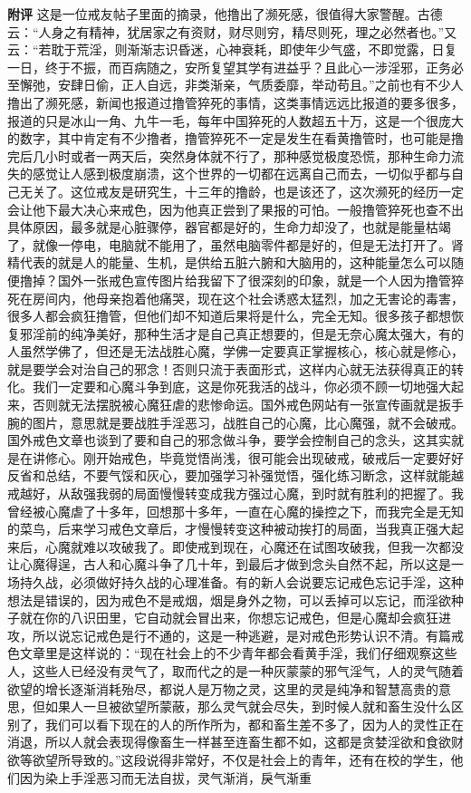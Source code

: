 \begin{case}
    \textbf{附评} 这是一位戒友帖子里面的摘录，他撸出了濒死感，很值得大家警醒。古德云：“人身之有精神，犹居家之有资财，财尽则穷，精尽则死，理之必然者也。”又云：“若耽于荒淫，则渐渐志识昏迷，心神衰耗，即使年少气盛，不即觉露，日复一日，终于不振，而百病随之，安所复望其学有进益乎？且此心一涉淫邪，正务必至懈弛，安肆日偷，正人自远，非类渐亲，气质委靡，举动苟且。”之前也有不少人撸出了濒死感，新闻也报道过撸管猝死的事情，这类事情远远比报道的要多很多，报道的只是冰山一角、九牛一毛，每年中国猝死的人数超五十万，这是一个很庞大的数字，其中肯定有不少撸者，撸管猝死不一定是发生在看黄撸管时，也可能是撸完后几小时或者一两天后，突然身体就不行了，那种感觉极度恐慌，那种生命力流失的感觉让人感到极度崩溃，这个世界的一切都在远离自己而去，一切似乎都与自己无关了。这位戒友是研究生，十三年的撸龄，也是该还了，这次濒死的经历一定会让他下最大决心来戒色，因为他真正尝到了果报的可怕。一般撸管猝死也查不出具体原因，最多就是心脏骤停，器官都是好的，生命力却没了，也就是能量枯竭了，就像一停电，电脑就不能用了，虽然电脑零件都是好的，但是无法打开了。肾精代表的就是人的能量、生机，是供给五脏六腑和大脑用的，这种能量怎么可以随便撸掉？国外一张戒色宣传图片给我留下了很深刻的印象，就是一个人因为撸管猝死在房间内，他母亲抱着他痛哭，现在这个社会诱惑太猛烈，加之无害论的毒害，很多人都会疯狂撸管，但他们却不知道后果将是什么，完全无知。很多孩子都想恢复邪淫前的纯净美好，那种生活才是自己真正想要的，但是无奈心魔太强大，有的人虽然学佛了，但还是无法战胜心魔，学佛一定要真正掌握核心，核心就是修心，就是要学会对治自己的邪念！否则只流于表面形式，这样内心就无法获得真正的转化。我们一定要和心魔斗争到底，这是你死我活的战斗，你必须不顾一切地强大起来，否则就无法摆脱被心魔狂虐的悲惨命运。国外戒色网站有一张宣传画就是扳手腕的图片，意思就是要战胜手淫恶习，战胜自己的心魔，比心魔强，就不会破戒。国外戒色文章也谈到了要和自己的邪念做斗争，要学会控制自己的念头，这其实就是在讲修心。刚开始戒色，毕竟觉悟尚浅，很可能会出现破戒，破戒后一定要好好反省和总结，不要气馁和灰心，要加强学习补强觉悟，强化练习断念，这样就能越戒越好，从敌强我弱的局面慢慢转变成我方强过心魔，到时就有胜利的把握了。我曾经被心魔虐了十多年，回想那十多年，一直在心魔的操控之下，而我完全是无知的菜鸟，后来学习戒色文章后，才慢慢转变这种被动挨打的局面，当我真正强大起来后，心魔就难以攻破我了。即使戒到现在，心魔还在试图攻破我，但我一次都没让心魔得逞，古人和心魔斗争了几十年，到最后才做到念头自然不起，所以这是一场持久战，必须做好持久战的心理准备。有的新人会说要忘记戒色忘记手淫，这种想法是错误的，因为戒色不是戒烟，烟是身外之物，可以丢掉可以忘记，而淫欲种子就在你的八识田里，它自动就会冒出来，你想忘记戒色，但是心魔却会疯狂进攻，所以说忘记戒色是行不通的，这是一种逃避，是对戒色形势认识不清。有篇戒色文章里是这样说的：“现在社会上的不少青年都会看黄手淫，我们仔细观察这些人，这些人已经没有灵气了，取而代之的是一种灰蒙蒙的邪气淫气，人的灵气随着欲望的增长逐渐消耗殆尽，都说人是万物之灵，这里的灵是纯净和智慧高贵的意思，但如果人一旦被欲望所蒙蔽，那么灵气就会尽失，到时候人就和畜生没什么区别了，我们可以看下现在的人的所作所为，都和畜生差不多了，因为人的灵性正在消退，所以人就会表现得像畜生一样甚至连畜生都不如，这都是贪婪淫欲和食欲财欲等欲望所导致的。”这段说得非常好，不仅是社会上的青年，还有在校的学生，他们因为染上手淫恶习而无法自拔，灵气渐消，戾气渐重
\end{case}
